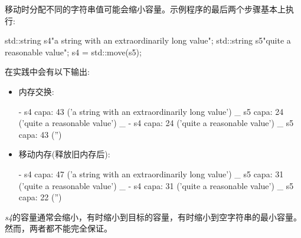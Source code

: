 移动时分配不同的字符串值可能会缩小容量。示例程序的最后两个步骤基本上执行:

\begin{cppcode}
std::string s4{"a string with an extraordinarily long value"};
std::string s5{"quite a reasonable value"};
s4 = std::move(s5);
\end{cppcode}

在实践中会有以下输出:

\begin{itemize}
	\item 内存交换:
	\begin{shell} 	
	- s4 capa: 43 ('a string with an extraordinarily long value') _
	s5 capa: 24 ('quite a reasonable value') _
	- s4 capa: 24 ('quite a reasonable value') _
	s5 capa: 43 ('')
	\end{shell}	
	\item 移动内存(释放旧内存后):
	\begin{shell}
	- s4 capa: 47 ('a string with an extraordinarily long value') _
	s5 capa: 31 ('quite a reasonable value') _
	- s4 capa: 31 ('quite a reasonable value') _
	s5 capa: 22 ('')
	\end{shell}	
\end{itemize}

\textit{s4}的容量通常会缩小，有时缩小到目标的容量，有时缩小到空字符串的最小容量。然而，两者都不能完全保证。













